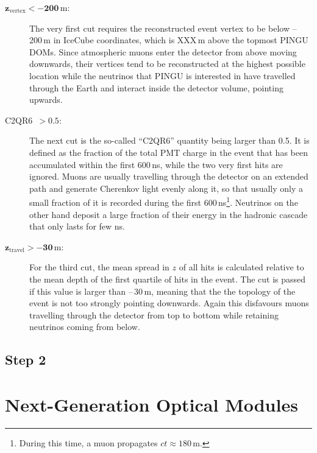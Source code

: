 \begin{description}
 \item[$\mathbf{z_\mathrm{vertex} < -200}$\,m:] The very first cut requires the
  reconstructed event vertex to be below --\,200\,m in IceCube coordinates,
  which is XXX\,m above the topmost PINGU DOMs. Since atmospheric muons enter
  the detector from above moving downwards, their vertices tend to be
  reconstructed  at the highest possible location while the neutrinos that PINGU
  is interested  in have travelled through the Earth and interact inside the
  detector volume,  pointing upwards.

\item[C2QR6\ $\mathbf{>0.5}$:] The next cut is the so-called ``C2QR6'' quantity
  being  larger than 0.5. It is defined as the fraction of the total PMT charge
  in the  event that has been accumulated within the first 600\,ns, while the
  two very  first hits are ignored. Muons are usually travelling through the
  detector on  an extended path and generate Cherenkov light evenly along it, so
  that usually  only a small fraction of it is recorded during the first
  600\,ns\footnote{During this time, a muon propagates $ct\approx180$\,m.}.
  Neutrinos on the other hand deposit a large fraction of their energy in the
  hadronic cascade that only lasts for few ns.

\item[$\mathbf{z_\mathrm{travel} > -30}$\,m:] For the third cut, the mean spread
  in $z$  of all hits is calculated relative to the mean depth of the first
  quartile of  hits in the event. The cut is passed if this value is larger than
  --\,30\,m,  meaning that the the topology of the event is not too strongly
  pointing  downwards. Again this disfavours muons travelling through the
  detector from  top to bottom while retaining neutrinos coming from below.
\end{description}


\subsection{Step 2}
\label{sec:cuts_step2}


\section{Next-Generation Optical Modules}
\label{sec:Gen2DOM}

